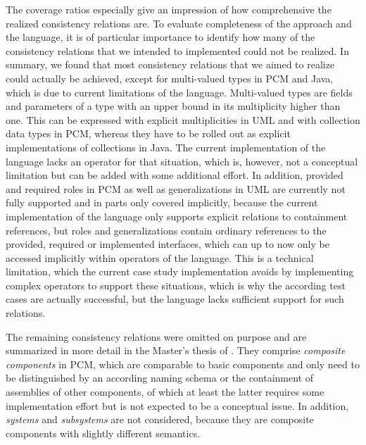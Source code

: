 The coverage ratios especially give an impression of how comprehensive the realized consistency relations are.
To evaluate completeness of the \commonalities approach and the language, it is of particular importance to identify how many of the consistency relations that we intended to implemented could not be realized.
In summary, we found that most consistency relations that we aimed to realize could actually be achieved, except for multi-valued types in \gls{PCM} and Java, which is due to current limitations of the language.
Multi-valued types are fields and parameters of a type with an upper bound in its multiplicity higher than one.
This can be expressed with explicit multiplicities in \gls{UML} and with collection data types in \gls{PCM}, whereas they have to be rolled out as explicit implementations of collections in Java.
The current implementation of the \commonalities language lacks an operator for that situation, which is, however, not a conceptual limitation but can be added with some additional effort.
In addition, provided and required roles in \gls{PCM} as well as generalizations in \gls{UML} are currently not fully supported and in parts only covered implicitly, because the current implementation of the \commonalities language only supports explicit relations to containment references, but roles and generalizations contain ordinary references to the provided, required or implemented interfaces, which can up to now only be accessed implicitly within operators of the \commonalities language.
This is a technical limitation, which the current case study implementation avoids by implementing complex operators to support these situations, which is why the according test cases are actually successful, but the language lacks sufficient support for such relations.

The remaining consistency relations were omitted on purpose and are summarized in more detail in the Master's thesis of .
They comprise \emph{composite components} in \gls{PCM}, which are comparable to basic components and only need to be distinguished by an according naming schema or the containment of assemblies of other components, of which at least the latter requires some implementation effort but is not expected to be a conceptual issue.
In addition, \emph{systems} and \emph{subsystems} are not considered, because they are composite components with slightly different semantics.

